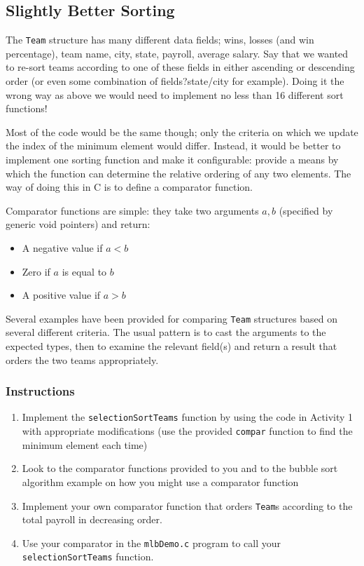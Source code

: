 \documentclass[12pt]{scrartcl}
\begin{document}
\subsection{Slightly Better Sorting}

The \texttt{Team} structure has many different data fields; 
wins, losses (and win percentage), team name, city, state, payroll, 
average salary.  Say that we wanted to re-sort teams according to 
one of these fields in either ascending or descending order (or even 
some combination of fields?state/city for example).  Doing it the 
wrong way as above we would need to implement no less than 
16 different sort functions!

Most of the code would be the same though; only the criteria on 
which we update the index of the minimum element would differ.  
Instead, it would be better to implement one sorting function and 
make it configurable: provide a means by which the function can 
determine the relative ordering of any two elements.  The way of 
doing this in C is to define a comparator function.

Comparator functions are simple: they take two arguments 
$a, b$ (specified by generic void pointers) and return:
\begin{itemize}
  \item A negative value if $a < b$ 
  \item Zero if $a$ is equal to $b$
  \item A positive value if $a > b$
\end{itemize}
Several examples have been provided for comparing \texttt{Team} 
structures based on several different criteria.  The usual pattern 
is to cast the arguments to the expected types, then to examine 
the relevant field(s) and return a result that orders the two teams 
appropriately.

\subsubsection*{Instructions}

\begin{enumerate}
  \item Implement the \texttt{selectionSortTeams} function 
	by using the code in Activity 1 with appropriate modifications 
	(use the provided \texttt{compar} function to find the 
	minimum element each time)
  \item Look to the comparator functions provided to you and to the 
	bubble sort algorithm example on how you might use a comparator 
	function
  \item Implement your own comparator function that orders \texttt{Team}s 
	according to the total payroll in decreasing order.
  \item Use your comparator in the \texttt{mlbDemo.c} program 
	to call your \texttt{selectionSortTeams} function.
\end{enumerate}
	
\end{document}
